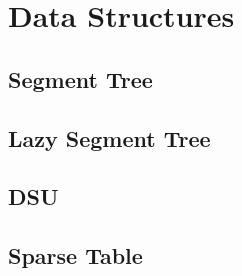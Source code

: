 \section{Data Structures}

\subsection{Segment Tree}



\subsection{Lazy Segment Tree}


\subsection{DSU}


\subsection{Sparse Table}

